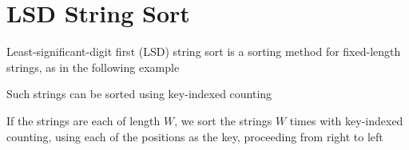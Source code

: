 \documentclass[8pt,a4paper,compress]{beamer}
\begin{document}
\section{LSD String Sort}
\begin{frame}[fragile]
\pause

Least-significant-digit first (LSD) string sort is a sorting method for fixed-length strings, as in the following example

\begin{center}
\end{center}

\pause
\bigskip

Such strings can be sorted using key-indexed counting

\pause
\bigskip

If the strings are each of length $W$, we sort the strings $W$ times with key-indexed counting, using each of the positions as the key, proceeding from right to left
\end{frame}
\end{document}
